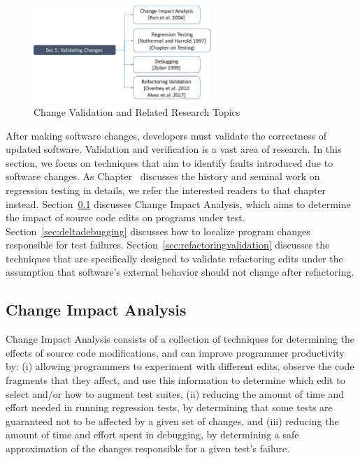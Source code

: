 \begin{figure}[ht]
 \centering
 \includegraphics[width=0.6\textwidth]{images/ChangeValidation.pdf} 
 \caption{Change Validation and Related Research Topics} 
 \label{fig:changevalidation} 
\end{figure}

After making software changes, developers must validate the correctness of updated software. Validation and verification is a vast area of research. In this section, we focus on techniques that aim to identify faults introduced due to software changes. As Chapter~ discusses the history and seminal work on regression testing in details, we refer the interested readers to that chapter instead. Section~\ref{sec:CIA} discusses Change Impact Analysis, which aims to determine the impact of source code edits on programs under test. Section~\ref{sec:deltadebugging} discusses how to localize program changes responsible for test failures. Section~\ref{sec:refactoringvalidation} discusses the techniques that are specifically designed to validate refactoring edits under the assumption that software's external behavior should not change after refactoring. 

\subsection{Change Impact Analysis} 
\label{sec:CIA} 
Change Impact Analysis consists of a collection of techniques for determining the effects of source code modifications, and can improve programmer productivity by: (i) allowing programmers to experiment with different edits, observe the code fragments that they affect, and use this information to determine which edit to select and/or how to augment test suites, (ii) reducing the amount of time and effort needed in running regression tests, by determining that some tests are guaranteed not to be affected by a given set of changes, and (iii) reducing the amount of time and effort spent in debugging, by determining a safe approximation of the changes responsible for a given test’s failure. 

